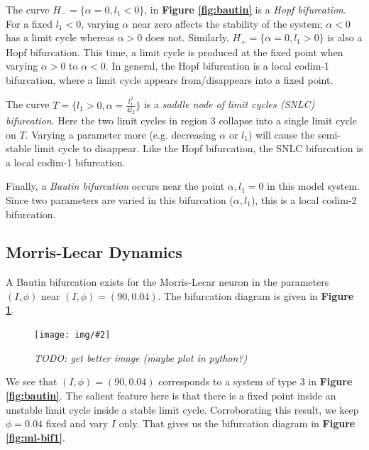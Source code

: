 \documentclass[letterpaper,12pt]{article}
\numberwithin{table}{section}
\numberwithin{figure}{section}
\numberwithin{equation}{section}
\newcommand{\centerfig}[2]{\begin{center}\texttt{[image: img/\#2]}\end{center}}
\newcommand{\ccaption}[1]{\caption{\textit{#1}}}
\newcommand{\reffig}[1]{\textbf{Figure \ref{#1}}}
\begin{document}
\begin{flushleft}
    The curve $H_- = \{\alpha = 0, l_1 < 0\}$, in \reffig{fig:bautin} is a \textit{Hopf bifurcation}. For a fixed $l_1 < 0$, varying $\alpha$ near zero affects the stability of the system; $\alpha < 0$ has a limit cycle whereas $\alpha > 0$ does not. Similarly, $H_+ = \{\alpha = 0, l_1 > 0\}$ is also a Hopf bifurcation. This time, a limit cycle is produced at the fixed point when varying $\alpha > 0$ to $\alpha < 0$. In general, the Hopf bifurcation is a local codim-1 bifurcation, where a limit cycle appears from/disappears into a fixed point.

    The curve $T = \{l_1 > 0, \alpha = \frac{l_1^2}{4l_2}\}$ is a \textit{saddle node of limit cycles (SNLC) bifurcation}. Here the two limit cycles in region 3 collapse into a single limit cycle on $T$. Varying a parameter more (e.g. decreasing $\alpha$ or $l_1$) will cause the semi-stable limit cycle to disappear. Like the Hopf bifurcation, the SNLC bifurcation is a local codim-1 bifurcation.

    Finally, a \textit{Bautin bifurcation} occurs near the point $\alpha, l_1 = 0$ in this model system. Since two parameters are varied in this bifurcation ($\alpha, l_1$), this is a local codim-2 bifurcation.

    \subsection{Morris-Lecar Dynamics}

    A Bautin bifurcation exists for the Morris-Lecar neuron in the parameters $(I, \phi)$ near $(I, \phi) = (90, 0.04)$. The bifurcation diagram is given in \reffig{fig:ml-bautin}.
    \begin{figure}[h]

        \centering
    
        \centerfig{0.7}{ml-bautin.jpg}

        \captionsetup{width=0.8\linewidth}
        \ccaption{TODO: get better image (maybe plot in python?)}
    
        \label{fig:ml-bautin}
    
    \end{figure}
    We see that $(I, \phi) = (90, 0.04)$ corresponds to a system of type 3 in \reffig{fig:bautin}. The salient feature here is that there is a fixed point inside an unstable limit cycle inside a stable limit cycle. Corroborating this result, we keep $\phi = 0.04$ fixed and vary $I$ only. That gives us the bifurcation diagram in \reffig{fig:ml-bif1}.
    \begin{figure}[h]


\end{figure}
\end{flushleft}
\end{document}
